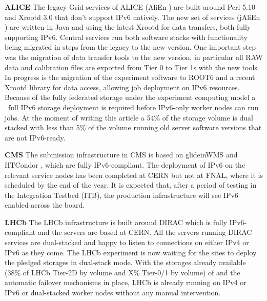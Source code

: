 \textbf{ALICE}
The legacy Grid services of ALICE (AliEn \cite{alien}) are built around Perl 5.10 and Xrootd 3.0 that don’t support IPv6 natively. The new set of services (jAliEn \cite{jalien}) are written in Java and using the latest Xrootd for data transfers, both fully supporting IPv6. Central services run both software stacks with functionality being migrated in steps from the legacy to the new version. One important step was the migration of data transfer tools to the new version, in particular all RAW data and calibration files are exported from Tier 0 to Tier 1s with the new tools. In progress is the migration of the experiment software to ROOT6 and a recent Xrootd library for data access, allowing job deployment on IPv6 resources.
Because of the fully federated storage under the experiment computing model a ~full IPv6 storage deployment is required before IPv6-only worker nodes can run jobs. At the moment of writing this article a 54\% of the storage volume is dual stacked with less than 5\% of the volume running old server software versions that are not IPv6-ready.



\textbf{CMS}
The submission infrastructure in CMS is based on glideinWMS \cite{glideinwms} and HTCondor \cite{htcondor}, which are fully IPv6-compliant. The deployment of IPv6 on the relevant service nodes has been completed at CERN but not at FNAL, where it is scheduled by the end of the year. It is expected that, after a period of testing in the Integration Testbed (ITB), the production infrastructure will see IPv6 enabled across the board.

\textbf{LHCb}
The LHCb infrastructure is built around DIRAC \cite{dirac} which is fully IPv6-compliant and the servers are based at CERN. All the servers running DIRAC services are dual-stacked and happy to listen to connections on either IPv4 or IPv6 as they come. The LHCb experiment is now waiting for the sites to deploy the pledged storages in dual-stack mode. With the storages already available (38\% of LHCb Tier-2D by volume and X\% Tier-0/1 by volume) of  and the automatic failover mechanisms in place, LHCb is already running on IPv4 or IPv6 or dual-stacked worker nodes without any manual intervention.

